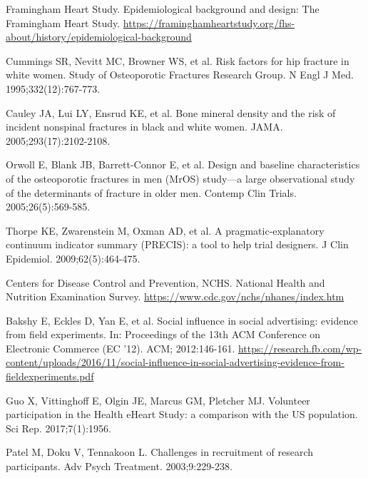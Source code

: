 \begin{references}
\item Framingham Heart Study. Epidemiological background and design: The Framingham Heart Study. \url{https://framinghamheartstudy.org/fhs-about/history/epidemiological-background}
\item Cummings SR, Nevitt MC, Browner WS, et al. Risk factors for hip fracture in white women. Study of Osteoporotic Fractures Research Group. N Engl J Med. 1995;332(12):767-773.
\item Cauley JA, Lui LY, Ensrud KE, et al. Bone mineral density and the risk of incident nonspinal fractures in black and white women. JAMA. 2005;293(17):2102-2108.
\item Orwoll E, Blank JB, Barrett-Connor E, et al. Design and baseline characteristics of the osteoporotic fractures in men (MrOS) study---a large observational study of the determinants of fracture in older men. Contemp Clin Trials. 2005;26(5):569-585.
\item Thorpe KE, Zwarenstein M, Oxman AD, et al. A pragmatic-explanatory continuum indicator summary (PRECIS): a tool to help trial designers. J Clin Epidemiol. 2009;62(5):464-475.
\item Centers for Disease Control and Prevention, NCHS. National Health and Nutrition Examination Survey. \url{https://www.cdc.gov/nchs/nhanes/index.htm}
\item Bakshy E, Eckles D, Yan E, et al. Social influence in social advertising: evidence from field experiments. In: Proceedings of the 13th ACM Conference on Electronic Commerce (EC '12). ACM; 2012:146-161. \url{https://research.fb.com/wp-content/uploads/2016/11/social-influence-in-social-advertising-evidence-from-fieldexperiments.pdf}
\item Guo X, Vittinghoff E, Olgin JE, Marcus GM, Pletcher MJ. Volunteer participation in the Health eHeart Study: a comparison with the US population. Sci Rep. 2017;7(1):1956.
\item Patel M, Doku V, Tennakoon L. Challenges in recruitment of research participants. Adv Psych Treatment. 2003;9:229-238.
\end{references}

